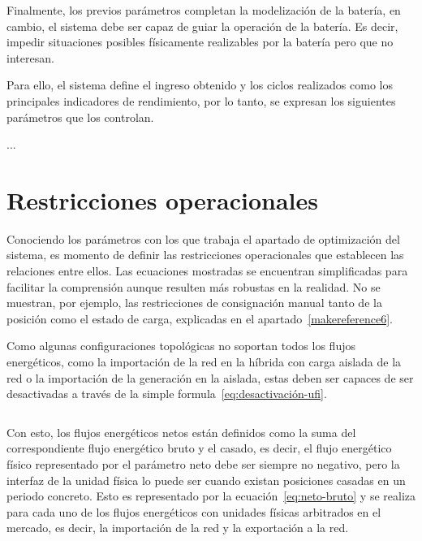 Finalmente, los previos parámetros completan la modelización de la batería, en cambio, el sistema debe ser capaz de guiar la operación de la batería. Es decir, impedir situaciones posibles físicamente realizables por la batería pero que no interesan.

Para ello, el sistema define el ingreso obtenido y los ciclos realizados como los principales indicadores de rendimiento, por lo tanto, se expresan los siguientes parámetros que los controlan.

...

\section{Restricciones operacionales}
\label{makereference5.2}

Conociendo los parámetros con los que trabaja el apartado de optimización del sistema, es momento de definir las restricciones operacionales que establecen las relaciones entre ellos. Las ecuaciones mostradas se encuentran simplificadas para facilitar la comprensión aunque resulten más robustas en la realidad. No se muestran, por ejemplo, las restricciones de consignación manual tanto de la posición como el estado de carga, explicadas en el apartado~\ref{makereference6}.

Como algunas configuraciones topológicas no soportan todos los flujos energéticos, como la importación de la red en la híbrida con carga aislada de la red o la importación de la generación en la aislada, estas deben ser capaces de ser desactivadas a través de la simple formula~\ref{eq:desactivación-ufi}.

\begin{equation}
  \label{eq:desactivación-ufi}
\end{equation}

Con esto, los flujos energéticos netos están definidos como la suma del correspondiente flujo energético bruto y el casado, es decir, el flujo energético físico representado por el parámetro neto debe ser siempre no negativo, pero la interfaz de la unidad física lo puede ser cuando existan posiciones casadas en un periodo concreto. Esto es representado por la ecuación~\ref{eq:neto-bruto} y se realiza para cada uno de los flujos energéticos con unidades físicas arbitrados en el mercado, es decir, la importación de la red y la exportación a la red.

\begin{equation}
  \label{eq:neto-bruto}
\end{equation}

